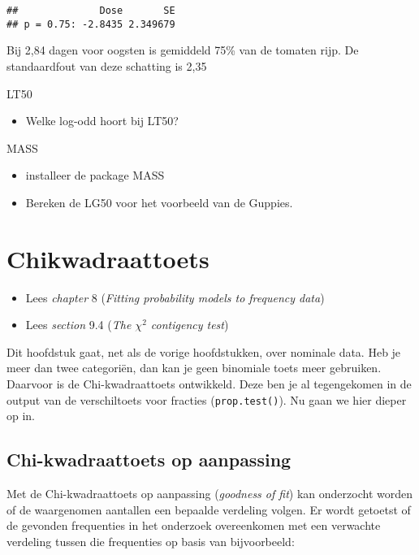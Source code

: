 \documentclass[]{book}
\providecommand{\tightlist}{%
  \setlength{\itemsep}{0pt}\setlength{\parskip}{0pt}}
\theoremstyle{definition}
\theoremstyle{definition}
\theoremstyle{definition}
\theoremstyle{remark}
\let\BeginKnitrBlock\begin \let\EndKnitrBlock\end
\begin{document}
\begin{verbatim}
##              Dose       SE
## p = 0.75: -2.8435 2.349679
\end{verbatim}

Bij 2,84 dagen voor oogsten is gemiddeld 75\% van de tomaten rijp. De
standaardfout van deze schatting is 2,35

\BeginKnitrBlock{exercise}
\protect\hypertarget{exr:LT50}{}{\label{exr:LT50} }LT50

\begin{itemize}
\tightlist
\item
  Welke log-odd hoort bij LT50?
\end{itemize}
\EndKnitrBlock{exercise}

\BeginKnitrBlock{exercise}
\protect\hypertarget{exr:MASS}{}{\label{exr:MASS} }MASS

\begin{itemize}
\tightlist
\item
  installeer de package MASS
\item
  Bereken de LG50 voor het voorbeeld van de Guppies.
\end{itemize}
\EndKnitrBlock{exercise}

\chapter{Chikwadraattoets}\label{chikwadraattoets}

\BeginKnitrBlock{ABD}
\begin{itemize}
\tightlist
\item
  Lees \emph{chapter} 8 (\emph{Fitting probability models to frequency
  data})
\item
  Lees \emph{section} 9.4 (\emph{The \(\chi^2\) contigency test})
\end{itemize}
\EndKnitrBlock{ABD}

Dit hoofdstuk gaat, net als de vorige hoofdstukken, over nominale data.
Heb je meer dan twee categoriën, dan kan je geen binomiale toets meer
gebruiken. Daarvoor is de Chi-kwadraattoets ontwikkeld. Deze ben je al
tegengekomen in de output van de verschiltoets voor fracties
(\texttt{prop.test()}). Nu gaan we hier dieper op in.

\section{Chi-kwadraattoets op
aanpassing}\label{chi-kwadraattoets-op-aanpassing}

Met de Chi-kwadraattoets op aanpassing (\emph{goodness of fit}) kan
onderzocht worden of de waargenomen aantallen een bepaalde verdeling
volgen. Er wordt getoetst of de gevonden frequenties in het onderzoek
overeenkomen met een verwachte verdeling tussen die frequenties op basis
van bijvoorbeeld:
\end{document}
